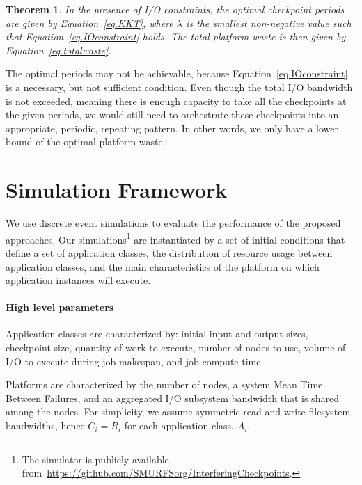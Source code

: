 \documentclass[conference,nofonttune]{IEEEtran}
\newtheorem{theorem}{Theorem}
\newcommand{\app}[1]{A_{#1}}
\newcommand{\ckpt}[1]{C_{#1}}
\newcommand{\reco}[1]{R_{#1}}
\begin{document}
\begin{theorem}
     In the presence of I/O constraints, the optimal checkpoint periods are given by
     Equation~\eqref{eq.KKT}, where $\lambda$ is the smallest non-negative value such
     that Equation~\eqref{eq.IOconstraint} holds. The total platform waste is then
     given by Equation~\eqref{eq.totalwaste}.
\end{theorem}

The optimal periods may not be achievable, because
Equation~\eqref{eq.IOconstraint} is a necessary, but not sufficient condition.
Even though the total I/O bandwidth is not exceeded, meaning there is enough
capacity to take all the checkpoints at the given periods, we would still need
to orchestrate these checkpoints into an appropriate, periodic, repeating
pattern.  In other words, we only have a lower bound of the optimal platform
waste.

%

\section{Simulation Framework}
\label{sec:simulator}

We use discrete event simulations to evaluate the performance of the proposed
approaches.  Our simulations\footnote{The simulator is publicly available
from~\url{https://github.com/SMURFSorg/InterferingCheckpoints}.} are instantiated
by a set of initial conditions that define a set of application classes, the
distribution of resource usage between application classes, and the main
characteristics of the platform on which application instances will execute.

\paragraph*{High level parameters}
Application classes are characterized by: initial input and output sizes, checkpoint
size, quantity of work to execute, number of nodes to use, volume of I/O to
execute during job makespan, and job compute time.

Platforms are characterized by the number of nodes, a system Mean Time
Between Failures, and an aggregated I/O subsystem bandwidth that is shared among the
nodes. For simplicity, we assume symmetric read and write filesystem bandwidths, hence
$\ckpt{i}=\reco{i}$ for each application class, $\app{i}$.
\end{document}
